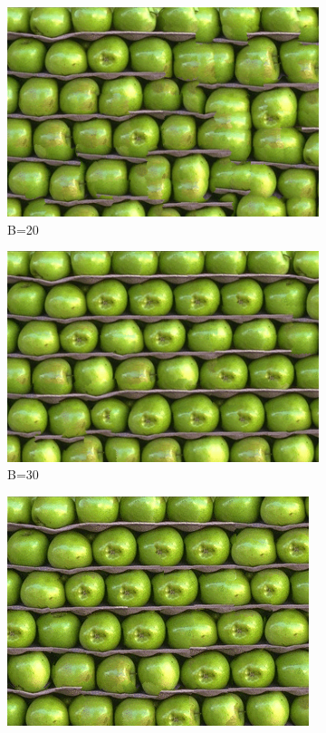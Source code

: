 \documentclass[10pt,twocolumn,letterpaper]{article}
\begin{document}
\begin{figure}[h]
    \centering
    \begin{subfigure}[h]{0.2\textwidth}
        \centering
        \includegraphics[scale=0.25]{../results/syn/out_apples_B_20.png}
        \caption{B=20}
    \end{subfigure}
    \hfill
    \begin{subfigure}[h]{0.2\textwidth}
       \centering
       \includegraphics[scale=0.25]{../results/syn/out_apples_B_30.png}
       \caption{B=30}
   \end{subfigure}
   \hfill
   \begin{subfigure}[h]{0.2\textwidth}
       \centering
       \includegraphics[scale=0.25]{../results/syn/out_apples_B_40.png}

\end{subfigure}
\end{figure}
\end{document}
